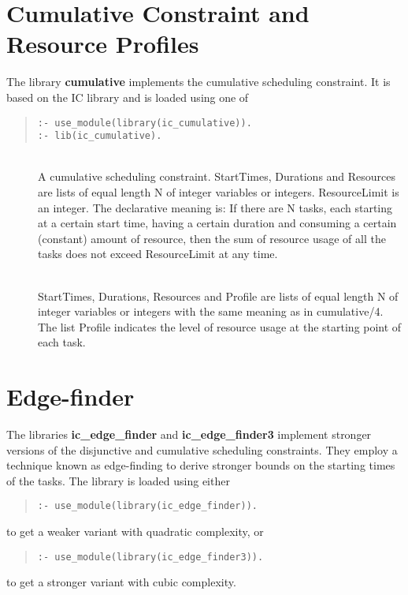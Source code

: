 \section{Cumulative Constraint and Resource Profiles}

The library {\bf cumulative} implements the cumulative scheduling constraint.
It is based on the IC library and is loaded using one of 
\begin{quote}\begin{verbatim}
:- use_module(library(ic_cumulative)).
:- lib(ic_cumulative).
\end{verbatim}\end{quote}


\begin{description}
\item[]\ \\
A cumulative scheduling constraint. StartTimes, Durations and Resources
are lists of equal length N of integer variables or integers.
ResourceLimit is an integer. The declarative meaning is:
If there are N tasks, each starting at a certain start time, having
a certain duration and consuming a certain (constant) amount of
resource, then the sum of resource usage of all the tasks does not
exceed ResourceLimit at any time.

\item[]\ \\
StartTimes, Durations, Resources and Profile
are lists of equal length N of integer variables or integers
with the same meaning as in cumulative/4.
The list Profile indicates the level of resource usage at the
starting point of each task.
\end{description}


\section{Edge-finder}

The libraries {\bf ic_edge_finder} and {\bf ic_edge_finder3}
implement stronger versions of the
disjunctive and cumulative scheduling constraints. They employ
a technique known as edge-finding to derive stronger bounds on
the starting times of the tasks.
The library is loaded using either
\begin{quote}\begin{verbatim}
:- use_module(library(ic_edge_finder)).
\end{verbatim}\end{quote}
to get a weaker variant with quadratic complexity, or
\begin{quote}\begin{verbatim}
:- use_module(library(ic_edge_finder3)).
\end{verbatim}\end{quote}
to get a stronger variant with cubic complexity.

